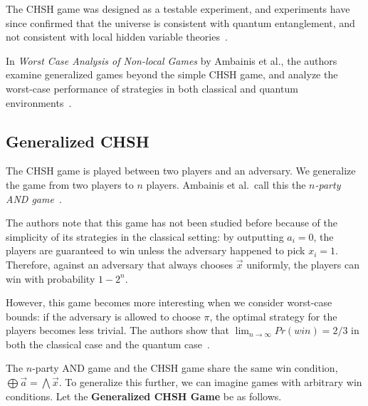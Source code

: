The CHSH game was designed as a testable experiment, and experiments have since confirmed that the universe is consistent with quantum entanglement, and not consistent with local hidden variable theories~\cite{aspect}.

In \emph{Worst Case Analysis of Non-local Games} by Ambainis et al., the authors examine generalized games beyond the simple CHSH game, and analyze the worst-case performance of strategies in both classical and quantum environments~\cite{ABBSSV}.

\subsection{Generalized CHSH}

The CHSH game is played between two players and an adversary. We generalize the game from two players to $n$ players. Ambainis et al.~call this the \emph{$n$-party AND game}~\cite{ABBSSV}.

The authors note that this game has not been studied before because of the simplicity of its strategies in the classical setting: by outputting $a_i=0$, the players are guaranteed to win unless the adversary happened to pick $x_i=1$. Therefore, against an adversary that always chooses $\vec{x}$ uniformly, the players can win with probability $1-2^n$.

However, this game becomes more interesting when we consider worst-case bounds: if the adversary is allowed to choose $\pi$, the optimal strategy for the players becomes less trivial. The authors show that $\lim_{n \rightarrow \infty}Pr(win) = 2/3$ in both the classical case and the quantum case~\cite{ABBSSV}.

The $n$-party AND game and the CHSH game share the same win condition, $\bigoplus \vec{a} = \bigwedge \vec{x}$. To generalize this further, we can imagine games with arbitrary win conditions. Let the \textbf{Generalized CHSH Game} be as follows.


